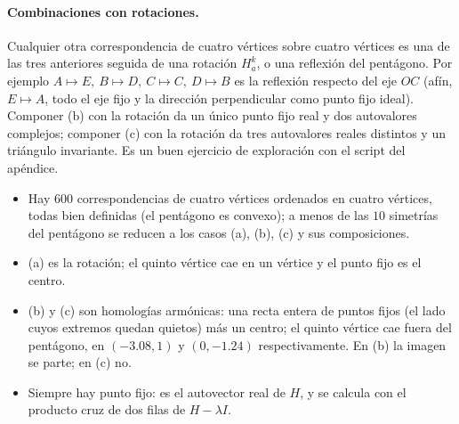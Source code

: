 \paragraph{Combinaciones con rotaciones.} Cualquier otra correspondencia de cuatro vértices
sobre cuatro vértices es una de las tres anteriores seguida de una rotación \(H_a^k\), o una
reflexión del pentágono. Por ejemplo \(A\mapsto E,\ B\mapsto D,\ C\mapsto C,\ D\mapsto B\)
es la reflexión respecto del eje \(OC\) (afín, \(E\mapsto A\), todo el eje fijo y la
dirección perpendicular como punto fijo ideal). Componer (b) con la rotación da un único punto
fijo real y dos autovalores complejos; componer (c) con la rotación da tres autovalores
reales distintos y un triángulo invariante. Es un buen ejercicio de exploración con el
script del apéndice.

\begin{resultado}
\begin{itemize}
  \item Hay \(600\) correspondencias de cuatro vértices ordenados en cuatro vértices, todas
  bien definidas (el pentágono es convexo); a menos de las \(10\) simetrías del pentágono se
  reducen a los casos (a), (b), (c) y sus composiciones.
  \item (a) es la rotación; el quinto vértice cae en un vértice y el punto fijo es el centro.
  \item (b) y (c) son homologías armónicas: una recta entera de puntos fijos (el lado cuyos
  extremos quedan quietos) más un centro; el quinto vértice cae fuera del pentágono, en
  \((-3.08,1)\) y \((0,-1.24)\) respectivamente. En (b) la imagen se parte; en (c) no.
  \item Siempre hay punto fijo: es el autovector real de \(H\), y se calcula con el producto
  cruz de dos filas de \(H-\lambda I\).
\end{itemize}
\end{resultado}

